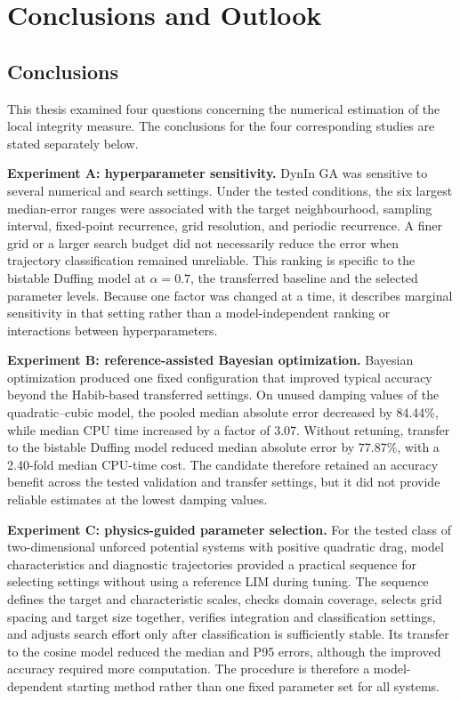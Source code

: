 \chapter{Conclusions and Outlook}
\label{chap:conclusions}

\section{Conclusions}

\begin{greenrevision}
This thesis examined four questions concerning the numerical estimation of the local integrity measure. The conclusions for the four corresponding studies are stated separately below.

\textbf{Experiment A: hyperparameter sensitivity.}
DynIn GA was sensitive to several numerical and search settings. Under the tested conditions, the six largest median-error ranges were associated with the target neighbourhood, sampling interval, fixed-point recurrence, grid resolution,  and periodic recurrence. A finer grid or a larger search budget did not necessarily reduce the error when trajectory classification remained unreliable. This ranking is specific to the bistable Duffing model at $\alpha=0.7$, the transferred baseline and the selected parameter levels. Because one factor was changed at a time, it describes marginal sensitivity in that setting rather than a model-independent ranking or interactions between hyperparameters.

\textbf{Experiment B: reference-assisted Bayesian optimization.}
Bayesian optimization produced one fixed configuration that improved typical accuracy beyond the Habib-based transferred settings. On unused damping values of the quadratic--cubic model, the pooled median absolute error decreased by 84.44\%, while median CPU time increased by a factor of 3.07. Without retuning, transfer to the bistable Duffing model reduced median absolute error by 77.87\%, with a 2.40-fold median CPU-time cost. The candidate therefore retained an accuracy benefit across the tested validation and transfer settings, but it did not provide reliable estimates at the lowest damping values.

\textbf{Experiment C: physics-guided parameter selection.}
For the tested class of two-dimensional unforced potential systems with positive quadratic drag, model characteristics and diagnostic trajectories provided a practical sequence for selecting settings without using a reference LIM during tuning. The sequence defines the target and characteristic scales, checks domain coverage, selects grid spacing and target size together, verifies integration and classification settings, and adjusts search effort only after classification is sufficiently stable. Its transfer to the cosine model reduced the median and P95 errors, although the improved accuracy required more computation. The procedure is therefore a model-dependent starting method rather than one fixed parameter set for all systems.


\end{greenrevision}
